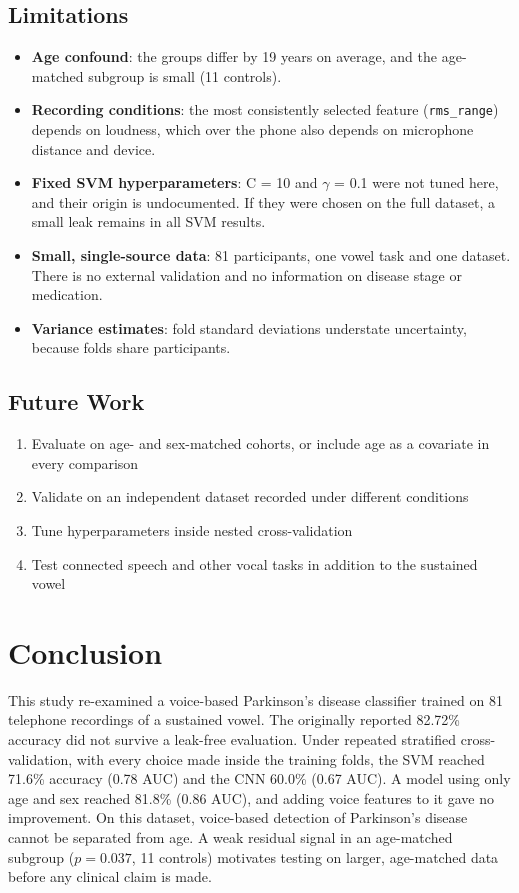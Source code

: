 \documentclass{paper}
\begin{document}
\subsection{Limitations}
\begin{itemize}
    \item \textbf{Age confound}: the groups differ by 19 years on average, and the age-matched subgroup is small (11 controls).
    \item \textbf{Recording conditions}: the most consistently selected feature (\texttt{rms\_range}) depends on loudness, which over the phone also depends on microphone distance and device.
    \item \textbf{Fixed SVM hyperparameters}: C = 10 and $\gamma$ = 0.1 were not tuned here, and their origin is undocumented. If they were chosen on the full dataset, a small leak remains in all SVM results.
    \item \textbf{Small, single-source data}: 81 participants, one vowel task and one dataset. There is no external validation and no information on disease stage or medication.
    \item \textbf{Variance estimates}: fold standard deviations understate uncertainty, because folds share participants.
\end{itemize}

\subsection{Future Work}
\begin{enumerate}
    \item Evaluate on age- and sex-matched cohorts, or include age as a covariate in every comparison
    \item Validate on an independent dataset recorded under different conditions
    \item Tune hyperparameters inside nested cross-validation
    \item Test connected speech and other vocal tasks in addition to the sustained vowel
\end{enumerate}

\section{Conclusion}
This study re-examined a voice-based Parkinson's disease classifier trained on 81 telephone recordings of a sustained vowel. The originally reported 82.72\% accuracy did not survive a leak-free evaluation. Under repeated stratified cross-validation, with every choice made inside the training folds, the SVM reached 71.6\% accuracy (0.78 AUC) and the CNN 60.0\% (0.67 AUC). A model using only age and sex reached 81.8\% (0.86 AUC), and adding voice features to it gave no improvement. On this dataset, voice-based detection of Parkinson's disease cannot be separated from age. A weak residual signal in an age-matched subgroup ($p = 0.037$, 11 controls) motivates testing on larger, age-matched data before any clinical claim is made.


\end{document}
